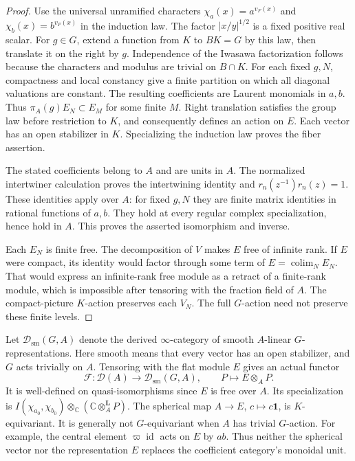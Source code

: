 \begin{proof}
Use the universal unramified characters
$\chi_a(x)=a^{v_F(x)}$ and $\chi_b(x)=b^{v_F(x)}$ in the induction law.
The factor $|x/y|^{1/2}$ is a fixed positive real scalar.
For $g\in G$, extend a function from $K$ to $BK=G$ by this law,
then translate it on the right by $g$.
Independence of the Iwasawa factorization follows because the
characters and modulus are trivial on $B\cap K$.
For each fixed $g,N$, compactness and local constancy give a finite partition
on which all diagonal valuations are constant.
The resulting coefficients are Laurent monomials in $a,b$.
Thus $\pi_A(g)E_N\subset E_M$ for some finite $M$.
Right translation satisfies the group law before restriction to $K$,
and consequently defines an action on $E$.
Each vector has an open stabilizer in $K$.
Specializing the induction law proves the fiber assertion.

The stated coefficients belong to $A$ and are units in $A$.
The normalized intertwiner calculation proves the intertwining identity
and $r_n(z^{-1})r_n(z)=1$.
These identities apply over $A$: for fixed $g,N$ they are finite matrix
identities in rational functions of $a,b$.
They hold at every regular complex specialization, hence hold in $A$.
This proves the asserted isomorphism and inverse.

Each $E_N$ is finite free.
The decomposition of $V$ makes $E$ free of infinite rank.
If $E$ were compact, its identity would factor through some term of
$E=\operatorname{colim}_NE_N$.
That would express an infinite-rank free module as a retract of a finite-rank module,
which is impossible after tensoring with the fraction field of $A$.
The compact-picture $K$-action preserves each $V_N$.
The full $G$-action need not preserve these finite levels.
\end{proof}

Let $\mathcal D_{\mathrm{sm}}(G,A)$ denote the derived $\infty$-category
of smooth $A$-linear $G$-representations.
Here smooth means that every vector has an open stabilizer, and $G$ acts trivially on $A$.
Tensoring with the flat module $E$ gives an actual functor
\[
 \mathcal F:\mathcal D(A)\longrightarrow\mathcal D_{\mathrm{sm}}(G,A),
 \qquad P\longmapsto E\otimes_A P.
\]
It is well-defined on quasi-isomorphisms since $E$ is free over $A$.
Its specialization is
$I(\chi_{a_0},\chi_{b_0})\otimes_{\mathbb C}
(\mathbb C\otimes_A^{\mathbf L}P)$.
The spherical map $A\to E$, $c\mapsto c\mathbf1$, is $K$-equivariant.
It is generally not $G$-equivariant when $A$ has trivial $G$-action.
For example, the central element $\varpi\operatorname{id}$ acts on $E$ by $ab$.
Thus neither the spherical vector nor the representation $E$
replaces the coefficient category's monoidal unit.

